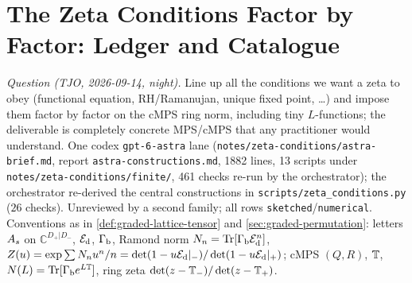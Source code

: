 
\section{The Zeta Conditions Factor by Factor: Ledger and Catalogue}
\label{sec:zeta-conditions}

\emph{Question (TJO, 2026-09-14, night).} Line up all the conditions we want a zeta to obey
(functional equation, RH/Ramanujan, unique fixed point, \dots) and impose them factor by factor on
the cMPS ring norm, including tiny $L$-functions; the deliverable is completely concrete MPS/cMPS
that any practitioner would understand. One codex \texttt{gpt-6-astra} lane
(\texttt{notes/zeta-conditions/astra-brief.md}, report \texttt{astra-constructions.md}, 1882 lines,
13 scripts under \texttt{notes/zeta-conditions/finite/}, 461 checks re-run by the orchestrator);
the orchestrator re-derived the central constructions in \texttt{scripts/zeta\_conditions.py}
($26$ checks). Unreviewed by a second family; all rows \texttt{sketched}/\texttt{numerical}.
Conventions as in \cref{def:graded-lattice-tensor} and \cref{sec:graded-permutation}: letters
$A_{s}$ on $\mathbb C^{D_+|D_-}$, $\mathcal E_{\mathrm d}$, $\Gamma_{\mathrm b}$, Ramond norm $N_n = \operatorname{Tr}[\Gamma_{\mathrm b}\mathcal E_{\mathrm d}^n]$,
$Z(u) = \exp\sum N_nu^n/n = \det(1-u\mathcal E_{\mathrm d}|_-)/\det(1-u\mathcal E_{\mathrm d}|_+)$; cMPS $(Q,R)$, $\mathbb T$,
$N(L) = \operatorname{Tr}[\Gamma_{\mathrm b} e^{L\mathbb T}]$, ring zeta $\det(z-\mathbb T_-)/\det(z-\mathbb T_+)$.

